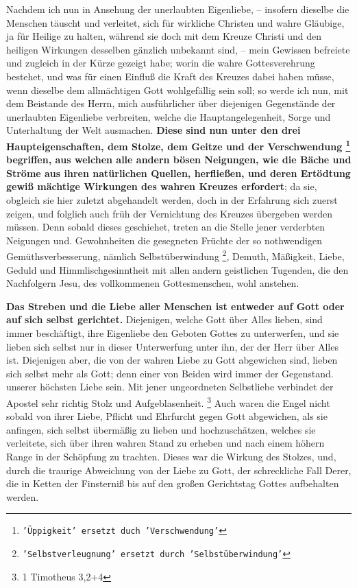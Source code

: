 Nachdem ich nun in Ansehung der unerlaubten Eigenliebe, -- insofern dieselbe die
Menschen täuscht und verleitet, sich für wirkliche Christen und wahre Gläubige,
ja für Heilige zu halten, während sie doch mit dem Kreuze Christi und den
heiligen Wirkungen desselben gänzlich unbekannt sind, -- mein Gewissen befreiete
und zugleich in der Kürze gezeigt habe; worin die wahre Gottesverehrung
bestehet, und was für einen Einfluß die Kraft des Kreuzes dabei haben müsse,
wenn dieselbe dem allmächtigen Gott wohlgefällig sein soll; so werde ich nun,
mit dem Beistande des Herrn, mich ausführlicher über diejenigen Gegenstände der
unerlaubten Eigenliebe  verbreiten, welche die Hauptangelegenheit, Sorge und
Unterhaltung der Welt ausmachen. \textbf{Diese sind nun unter den drei
Haupteigenschaften, dem Stolze, dem Geitze und der Verschwendung 
\footnote{\texttt{'Üppigkeit' ersetzt duch 'Verschwendung'}}  begriffen, aus
welchen alle andern bösen Neigungen, wie die Bäche und Ströme aus ihren
natürlichen Quellen, herfließen, und deren Ertödtung gewiß mächtige Wirkungen
des wahren Kreuzes erfordert}; da sie, obgleich sie hier zuletzt abgehandelt
werden, doch in der Erfahrung sich zuerst zeigen, und folglich auch früh der
Vernichtung des Kreuzes übergeben werden müssen. Denn sobald dieses geschiehet,
treten an die Stelle jener verderbten Neigungen und. Gewohnheiten die gesegneten
Früchte der so nothwendigen Gemüthsverbesserung, nämlich Selbstüberwindung \footnote{\texttt{'Selbstverleugnung' ersetzt durch 'Selbstüberwindung'}},
Demuth, Mäßigkeit, Liebe, Geduld und Himmlischgesinntheit mit allen andern
geistlichen Tugenden, die den Nachfolgern Jesu, des vollkommenen Gottesmenschen,
wohl anstehen.

\medskip

\textbf{Das Streben und die Liebe aller Menschen ist entweder auf Gott oder auf sich
selbst gerichtet.} Diejenigen, welche Gott über Alles lieben, sind immer
beschäftigt, ihre Eigenliebe den Geboten Gottes zu unterwerfen, und sie lieben
sich selbst nur in dieser Unterwerfung unter ihn, der der Herr über Alles ist.
Diejenigen aber, die von der wahren Liebe zu Gott abgewichen sind, lieben sich
selbst mehr als Gott; denn einer von Beiden wird immer der Gegenstand. unserer
höchsten Liebe sein. Mit jener ungeordneten Selbstliebe verbindet der Apostel
sehr richtig Stolz und Aufgeblasenheit.
\footnote{1 Timotheus 3,2+4}
Auch waren die
Engel nicht sobald von ihrer Liebe, Pflicht und Ehrfurcht gegen Gott abgewichen,
als sie anfingen, sich selbst übermäßig zu lieben und hochzuschätzen, welches
sie verleitete, sich über ihren wahren Stand zu erheben und nach einem höhern
Range in der Schöpfung zu trachten. Dieses war die Wirkung des Stolzes, und,
durch die traurige Abweichung von der Liebe zu Gott, der schreckliche Fall
Derer, die in Ketten der Finsterniß bis auf den großen Gerichtstag Gottes
aufbehalten werden.

